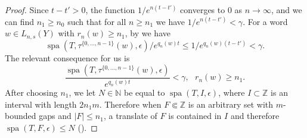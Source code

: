 \documentclass[a4paper,oneside]{amsart}
\renewcommand{\(}{\begin{dmath*}}
\renewcommand{\)}{\end{dmath*}}
\theoremstyle{definition}
\newcommand{\N}{\mathbb{N}}
\newcommand{\Z}{\mathbb{Z}}
\newcommand{\spa}{\operatorname{spa}}
\begin{document}
\begin{proof}
    Since $t-t'>0$, the function $1/e^{n(t-t')}$ converges to $0$ as $n\to\infty$, and we can find $n_1\geq n_0$ such that for all $n\geq n_1$ we have $1/e^{n(t-t')}<\gamma$. For a word $w\in L_{n,s}(Y)$ with $r_n(w)\geq n_1$, by  we have \[\spa(T,\tau^{\{0,\dots,n-1\}}(w),\epsilon)/e^{q_n(w)t}\leq 1/{e^{q_n(w)(t-t')}}<\gamma.\] The relevant consequence for us is 
    \begin{equation}\label{n1-definition}
    \frac{\spa(T,\tau^{\{0,\dots,n-1\}}(w),\epsilon)}{e^{q_n(w)t}}<\gamma, \ \ \ r_n(w)\geq n_1.
    \end{equation}
    After choosing $n_1$, we let $N\in\N$ be equal to $\spa(T,I,\epsilon)$, where $I\subset\Z$ is an interval with length $2n_1m$. Therefore when  $F\Subset\Z$ is an arbitrary set with $m$-bounded gaps and $|F|\leq n_1$, a translate of $F$ is contained in $I$ and therefore $\spa(T,F,\epsilon)\leq N$ ().  
    

\end{proof}
\end{document}
